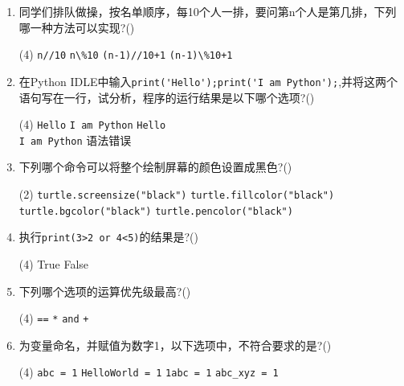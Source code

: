 \documentclass[11pt]{ctexart}
\begin{document}
\begin{enumerate}
        \item 同学们排队做操，按名单顺序，每10个人一排，要问第n个人是第几排，下列哪一种方法可以实现?(\qquad)
        \begin{tasks}(4)
            \task \lstinline!n//10!
            \task \lstinline!n\%10!
            \task \lstinline!(n-1)//10+1!
            \task \lstinline!(n-1)\%10+1!
        \end{tasks}
        
        \item 在Python IDLE中输入\lstinline!print('Hello');print('I am Python');!,并将这两个语句写在一行，试分析，程序的运行结果是以下哪个选项?(\qquad)
        \begin{tasks}(4)
            \task \lstinline!Hello!
            \task \lstinline!I am Python!
            \task \lstinline!Hello! \\ \lstinline!I am Python!
            \task 语法错误
        \end{tasks}

        \newpage
        \item 下列哪个命令可以将整个绘制屏幕的颜色设置成黑色?(\qquad)
        \begin{tasks}(2)
            \task \lstinline!turtle.screensize("black")!
            \task \lstinline!turtle.fillcolor("black")!
            \task \lstinline!turtle.bgcolor("black")!
            \task \lstinline!turtle.pencolor("black")!
        \end{tasks}

        \item 执行\lstinline!print(3>2 or 4<5)!的结果是?(\qquad)
        \begin{tasks}(4)
            \task True
            \task False
        \end{tasks}

        \item 下列哪个选项的运算优先级最高?(\qquad)
        \begin{tasks}(4)
            \task \lstinline{==}
            \task \lstinline{*}
            \task \lstinline{and}
            \task \lstinline{+}
        \end{tasks}

        \item 为变量命名，并赋值为数字1，以下选项中，不符合要求的是?(\qquad)
        \begin{tasks}(4)
            \task \lstinline!abc = 1!
            \task \lstinline!HelloWorld = 1!
            \task \lstinline!1abc = 1!
            \task \lstinline!abc_xyz = 1!
        \end{tasks}


\end{enumerate}
\end{document}
